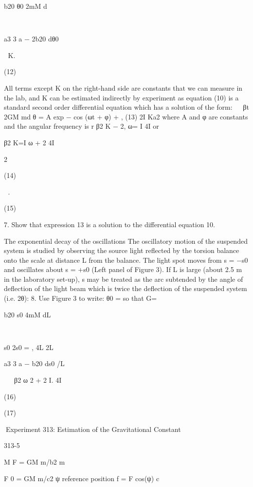 \documentclass{beamer}
\begin{document}
\begin{frame}
b20 θ0
2mM d



a3
3
a − 2b20 dθ0


K.

(12)

All terms except K on the right-hand side are constants that we can measure in the lab, and K can be
estimated indirectly by experiment as equation (10) is a standard second order differential equation which
has a solution of the form:


βt
2GM md
θ = A exp −
cos (ωt + φ) +
,
(13)
2I
Ka2
where A and φ are constants and the angular frequency is
r
β2
K
− 2,
ω=
I
4I
or

β2
K=I ω + 2
4I


2

(14)


.

(15)

7. Show that expression 13 is a solution to the differential equation 10.

The exponential decay of the oscillations
The oscillatory motion of the suspended system is studied by observing the source light reflected by the
torsion balance onto the scale at distance L from the balance. The light spot moves from s = −s0 and
oscillates about s = +s0 (Left panel of Figure 3). If L is large (about 2.5 m in the laboratory set-up), s may
be treated as the arc subtended by the angle of deflection of the light beam which is twice the deflection of
the suspended system (i.e. 2θ):
8. Use Figure 3 to write:
θ0 =
so that
G=

b20 s0
4mM dL



s0
2s0
=
,
4L
2L

a3
3
a − b20 ds0 /L



β2
ω 2 + 2 I.
4I

(16)

(17)

Experiment 313: Estimation of the Gravitational Constant

313-5

M
F = GM m/b2
m

F 0 = GM m/c2
ψ
reference position
f = F cos(ψ)
c


\end{frame}
\end{document}

